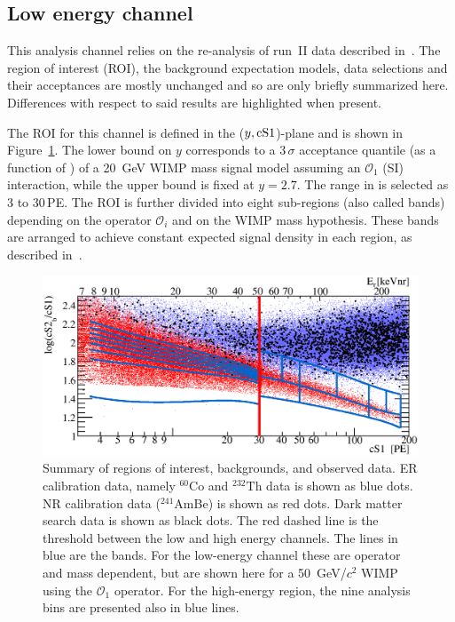 
\subsection{Low energy channel}
\label{subsec:LowE}
This analysis channel relies on the re-analysis of run~II data described in~\cite{xe100_run_combination}. The region of interest (ROI), the background 
expectation models, data selections and their acceptances are mostly unchanged and so are only briefly summarized here. Differences with respect to said results are highlighted when present.

The ROI for this channel is defined in the ($y,\mathrm{cS1}{}$)-plane and is shown in Figure~\ref{fig:phasespace}.  The lower 
bound on $y$ corresponds to a 3\,$\sigma$ acceptance quantile (as a function of \cSi{}) of a 20~GeV WIMP mass signal model assuming an $\mathcal{O}_1$ (SI) interaction, while the upper bound is fixed at $y=2.7$.
The range in \cSi{} is selected as 3 to 30\,PE. 
The ROI is further divided into eight sub-regions (also called bands) depending on the operator $\mathcal{O}_i$ and on the WIMP mass hypothesis. 
These bands are arranged to achieve constant expected signal density in each region, as described in~\cite{xe100_run_combination}.

\begin{figure}[]
\begin{minipage}{1\linewidth}
\centerline{\includegraphics[width=1\linewidth]{Figures/eft_sr.eps}}
\end{minipage}
\caption{Summary of regions of interest, backgrounds, and observed data. ER calibration data, namely $^{60}\mathrm{Co}$ and $^{232}\mathrm{Th}$ data is shown as blue dots. NR calibration data ($^{241}$AmBe) is shown as red dots. Dark matter search data is shown as black dots. The red dashed line is the threshold between the low and high energy channels. The lines in blue are the bands. For the low-energy channel these are operator and mass dependent, but are shown here for a 50~GeV/$c^2$ WIMP using the $\mathcal{O}_1$ operator. For the high-energy region, the nine analysis bins are presented also in blue lines.
}
\label{fig:phasespace}
\end{figure}  


